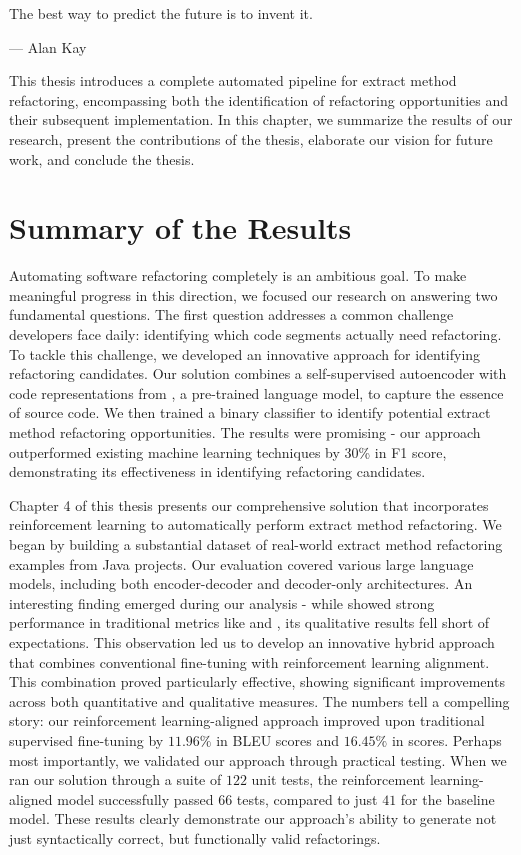 \epigraph{The best way to predict the future is to invent it.}{--- \textup{Alan Kay}}

\noindent

This thesis introduces a complete automated pipeline for extract method refactoring, encompassing both the identification of refactoring opportunities and their subsequent implementation. In this chapter, we summarize the results of our research, present the contributions of the thesis, elaborate our vision for future work, and conclude the thesis.

\section{Summary of the Results}

Automating software refactoring completely is an ambitious goal. To make meaningful progress in this direction, we focused our research on answering two fundamental questions. The first question addresses a common challenge developers face daily: identifying which code segments actually need refactoring. To tackle this challenge, we developed an innovative approach for identifying refactoring candidates. Our solution combines a self-supervised autoencoder with code representations from \GCB{}, a pre-trained language model, to capture the essence of source code. We then trained a binary classifier to identify potential extract method refactoring opportunities. The results were promising - our approach outperformed existing machine learning techniques by $30$\% in F1 score, demonstrating its effectiveness in identifying refactoring candidates.

Chapter 4 of this thesis presents our comprehensive solution that incorporates reinforcement learning to automatically perform extract method refactoring. We began by building a substantial dataset of real-world extract method refactoring examples from Java projects. Our evaluation covered various large language models, including both encoder-decoder and decoder-only architectures. An interesting finding emerged during our analysis - while \plbart{} showed strong performance in traditional metrics like \bleu{} and \rouge{}, its qualitative results fell short of expectations. This observation led us to develop an innovative hybrid approach that combines conventional fine-tuning with reinforcement learning alignment. This combination proved particularly effective, showing significant improvements across both quantitative and qualitative measures. The numbers tell a compelling story: our reinforcement learning-aligned approach improved upon traditional supervised fine-tuning by $11.96\%$ in BLEU scores and $16.45\%$ in \codebleu{} scores. Perhaps most importantly, we validated our approach through practical testing. When we ran our solution through a suite of $122$ unit tests, the reinforcement learning-aligned \codetf{} model successfully passed $66$ tests, compared to just $41$ for the baseline model. These results clearly demonstrate our approach's ability to generate not just syntactically correct, but functionally valid refactorings.

